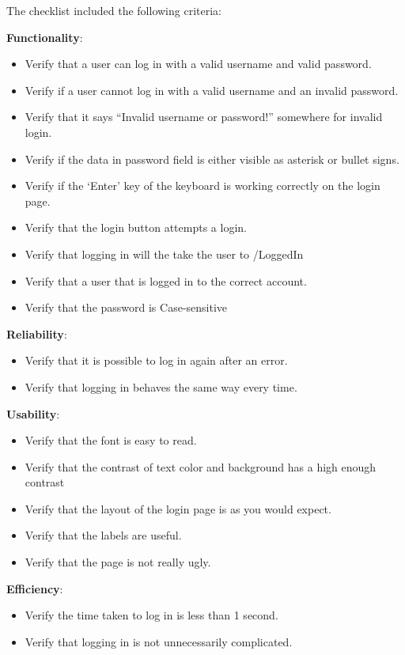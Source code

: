 \documentclass[journal,twocolumn]{IEEEtran}
\begin{document}
The checklist included the following criteria:

\textbf{Functionality}:
\begin{itemize}
    \item Verify that a user can log in with a valid username and valid password.
    \item Verify if a user cannot log in with a valid username and an invalid password.
    \item Verify that it says “Invalid username or password!” somewhere for invalid login.
    \item Verify if the data in password field is either visible as asterisk or bullet signs.
    \item Verify if the ‘Enter’ key of the keyboard is working correctly on the login page.
    \item Verify that the login button attempts a login.
    \item Verify that logging in will the take the user to /LoggedIn
    \item Verify that a user that is logged in to the correct account.
    \item Verify that the password is Case-sensitive
\end{itemize}

\textbf{Reliability}:

\begin{itemize}
    \item Verify that it is possible to log in again after an error.
    \item Verify that logging in behaves the same way every time.
\end{itemize}

\textbf{Usability}:

\begin{itemize}
    \item Verify that the font is easy to read.
    \item Verify that the contrast of text color and background has a high enough contrast
    \item Verify that the layout of the login page is as you would expect.
    \item Verify that the labels are useful.
    \item Verify that the page is not really ugly.
\end{itemize}

\textbf{Efficiency}:

\begin{itemize}
    \item Verify the time taken to log in is less than 1 second.
    \item Verify that logging in is not unnecessarily complicated.
\end{itemize}
\end{document}

